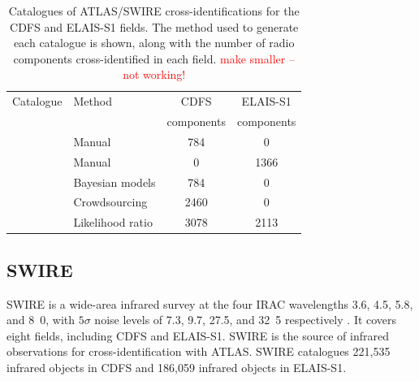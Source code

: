 \documentclass[fleqn,usenatbib,usedcolumn]{mnras}
\newcommand{\jansky}{\text{Jy}}
\begin{document}
    \begin{table}
      \caption{Catalogues of ATLAS/SWIRE cross-identifications for the CDFS
        and ELAIS-S1 fields. The method used to generate each catalogue is
        shown, along with the number of radio components cross-identified in each
        field. \textcolor{red}{make smaller -- not working!}}
      \label{tab:atlas-cids}
      \begin{tabular}{llcc}
        \hline
        Catalogue & Method & CDFS & ELAIS-S1\\
         & & components & components\\
        \hline
        \citet{norris06} & Manual & 784 & 0\\
        \citet{middelberg08} & Manual & 0 & 1366\\
        \citet{fan15} & Bayesian models & 784 & 0\\
        \citet{wong17} & Crowdsourcing & 2460 & 0 \\
        \citet{weston17} & Likelihood ratio & 3078 & 2113\\
        \hline
      \end{tabular}
    \end{table}





  \subsection{SWIRE}\label{sec:swire}

    SWIRE \citep{lonsdale03swire, surace05swire} is a wide-area infrared survey
    at the four IRAC wavelengths 3.6, 4.5, 5.8, and
    \unit{8.0}{\micro\meter}, with $5\sigma$ noise levels of 7.3,
    9.7, 27.5, and \unit{32.5}{\micro\jansky} respectively
    \citep{lonsdale03swire}. It covers eight fields, including CDFS and ELAIS-S1. SWIRE is the source of infrared
    observations for cross-identification with ATLAS. SWIRE catalogues 221,535
    infrared objects in CDFS and 186,059 infrared objects in ELAIS-S1.
\end{document}
